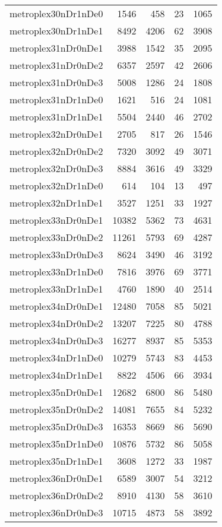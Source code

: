 \begin{longtable}{lrrrr}
metroplex30nDr1nDe0 & 1546 & 458 & 23 & 1065 \\
metroplex30nDr1nDe1 & 8492 & 4206 & 62 & 3908 \\
metroplex31nDr0nDe1 & 3988 & 1542 & 35 & 2095 \\
metroplex31nDr0nDe2 & 6357 & 2597 & 42 & 2606 \\
metroplex31nDr0nDe3 & 5008 & 1286 & 24 & 1808 \\
metroplex31nDr1nDe0 & 1621 & 516 & 24 & 1081 \\
metroplex31nDr1nDe1 & 5504 & 2440 & 46 & 2702 \\
metroplex32nDr0nDe1 & 2705 & 817 & 26 & 1546 \\
metroplex32nDr0nDe2 & 7320 & 3092 & 49 & 3071 \\
metroplex32nDr0nDe3 & 8884 & 3616 & 49 & 3329 \\
metroplex32nDr1nDe0 & 614 & 104 & 13 & 497 \\
metroplex32nDr1nDe1 & 3527 & 1251 & 33 & 1927 \\
metroplex33nDr0nDe1 & 10382 & 5362 & 73 & 4631 \\
metroplex33nDr0nDe2 & 11261 & 5793 & 69 & 4287 \\
metroplex33nDr0nDe3 & 8624 & 3490 & 46 & 3192 \\
metroplex33nDr1nDe0 & 7816 & 3976 & 69 & 3771 \\
metroplex33nDr1nDe1 & 4760 & 1890 & 40 & 2514 \\
metroplex34nDr0nDe1 & 12480 & 7058 & 85 & 5021 \\
metroplex34nDr0nDe2 & 13207 & 7225 & 80 & 4788 \\
metroplex34nDr0nDe3 & 16277 & 8937 & 85 & 5353 \\
metroplex34nDr1nDe0 & 10279 & 5743 & 83 & 4453 \\
metroplex34nDr1nDe1 & 8822 & 4506 & 66 & 3934 \\
metroplex35nDr0nDe1 & 12682 & 6800 & 86 & 5480 \\
metroplex35nDr0nDe2 & 14081 & 7655 & 84 & 5232 \\
metroplex35nDr0nDe3 & 16353 & 8669 & 86 & 5690 \\
metroplex35nDr1nDe0 & 10876 & 5732 & 86 & 5058 \\
metroplex35nDr1nDe1 & 3608 & 1272 & 33 & 1987 \\
metroplex36nDr0nDe1 & 6589 & 3007 & 54 & 3212 \\
metroplex36nDr0nDe2 & 8910 & 4130 & 58 & 3610 \\
metroplex36nDr0nDe3 & 10715 & 4873 & 58 & 3892 \\

\end{longtable}
